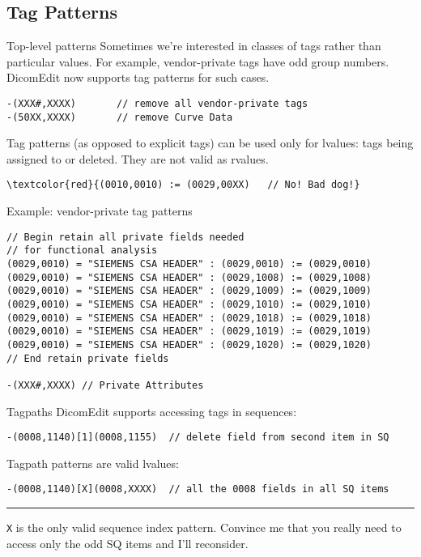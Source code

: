\documentclass{beamer}  %
\begin{document}
\subsection{Tag Patterns}
\begin{frame}[fragile]{Top-level patterns}
Sometimes we're interested in classes of tags rather than particular values.
For example, vendor-private tags have odd group numbers.
DicomEdit now supports tag patterns for such cases.

\begin{verbatim}
-(XXX#,XXXX)       // remove all vendor-private tags
-(50XX,XXXX)       // remove Curve Data
\end{verbatim}

\pause
Tag patterns (as opposed to explicit tags) can be used only for lvalues: 
tags being assigned to or deleted. They are not valid as rvalues.

\begin{Verbatim}[commandchars=\\\{\}]
\textcolor{red}{(0010,0010) := (0029,00XX)   // No! Bad dog!}
\end{Verbatim}
\end{frame}

\begin{frame}[fragile]{Example: vendor-private tag patterns}

\scriptsize
\begin{verbatim}
// Begin retain all private fields needed
// for functional analysis
(0029,0010) = "SIEMENS CSA HEADER" : (0029,0010) := (0029,0010)
(0029,0010) = "SIEMENS CSA HEADER" : (0029,1008) := (0029,1008)
(0029,0010) = "SIEMENS CSA HEADER" : (0029,1009) := (0029,1009)
(0029,0010) = "SIEMENS CSA HEADER" : (0029,1010) := (0029,1010)
(0029,0010) = "SIEMENS CSA HEADER" : (0029,1018) := (0029,1018)
(0029,0010) = "SIEMENS CSA HEADER" : (0029,1019) := (0029,1019)
(0029,0010) = "SIEMENS CSA HEADER" : (0029,1020) := (0029,1020)
// End retain private fields

-(XXX#,XXXX) // Private Attributes
\end{verbatim}
\end{frame}

\begin{frame}[fragile]{Tagpaths}
DicomEdit supports accessing tags in sequences:

\scriptsize
\begin{verbatim}
-(0008,1140)[1](0008,1155)  // delete field from second item in SQ
\end{verbatim}
\pause

\normalsize
Tagpath patterns are valid lvalues:
\scriptsize
\begin{verbatim}
-(0008,1140)[X](0008,XXXX)  // all the 0008 fields in all SQ items
\end{verbatim}

\pause
\hrule
\vspace{2mm}
\footnotesize
\verb|X| is the only valid sequence index pattern. Convince me that you
really need to access only the odd SQ items and I'll reconsider.
\end{frame}
\end{document}

